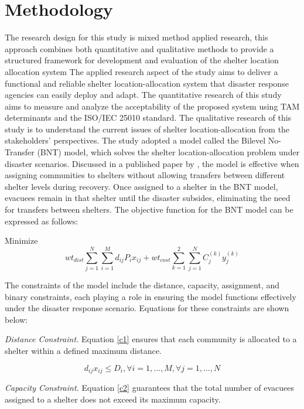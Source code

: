 \documentclass[12pt,a4paper,]{article}
\begin{document}
\section{Methodology}
	The research design for this study is mixed method applied research, this approach combines both quantitative and qualitative methods to provide a structured framework for development and evaluation of the shelter location allocation system
	The applied research aspect of the study aims to deliver a functional and reliable shelter location-allocation system that disaster response agencies can easily deploy and adapt. The quantitative research of this study aims to measure and analyze the acceptability of the proposed system using TAM determinants and the ISO/IEC 25010 standard. The qualitative research of this study is to understand the current issues of shelter location-allocation from the stakeholders’ perspectives.
	The study adopted a model called the Bilevel No-Transfer (BNT) model, which solves the shelter location-allocation problem under disaster scenarios. Discussed in a published paper by \textcite{LeahUP}, the model is effective when assigning communities to shelters without allowing transfers between different shelter levels during recovery. Once assigned to a shelter in the BNT model, evacuees remain in that shelter until the disaster subsides, eliminating the need for transfers between shelters. The objective function for the BNT model can be expressed as follows:
	
	Minimize 
	\begin{equation}
	wt_{dist}\sum_{j=1}^{N}\sum_{i=1}^{M}d_{ij}P_{i}x_{ij}+wt_{cost}\sum_{k=1}^{2}\sum_{j=1}^{N}C_{j}^{(k)}y_{j}^{(k)} 
	\end{equation}
	
	The constraints of the model include the distance, capacity, assignment, and binary constraints, each playing a role in ensuring the model functions effectively under the disaster response scenario. Equations for these constraints are shown below:
	
		\textit{Distance Constraint.} Equation \ref{c1} ensures that each community is allocated to a shelter within a defined maximum distance. 
	
	\begin{equation} 	
		\label{c1}
		d_{ij}x_{ij} \le D_{i}, \forall i = 1,..., M,  \forall j = 1,..., N 
	\end{equation}
	
	\textit{Capacity Constraint.} Equation \ref{c2} guarantees that the total number of evacuees assigned to a shelter does not exceed its maximum capacity. 
	
\end{document}
